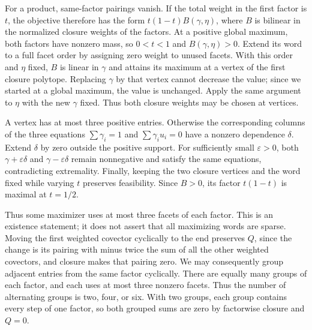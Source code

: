 For a product, same-factor pairings vanish. If the total weight in the first
factor is $t$, the objective therefore has the form
$t(1-t)B(\gamma,\eta)$, where $B$ is bilinear in the normalized closure
weights of the factors. At a positive global maximum, both factors have
nonzero mass, so $0<t<1$ and $B(\gamma,\eta)>0$. Extend its word to a full
facet order by assigning zero weight to unused facets. With this order and
$\eta$ fixed, $B$ is linear in $\gamma$ and attains its maximum at a vertex
of the first closure polytope. Replacing $\gamma$ by that vertex cannot
decrease the value; since we started at a global maximum, the value is
unchanged. Apply the same argument to $\eta$ with the new $\gamma$ fixed.
Thus both closure weights may be chosen at vertices.

A vertex has at most three positive entries. Otherwise the corresponding
columns of the three equations $\sum\gamma_i=1$ and
$\sum\gamma_i u_i=0$ have a nonzero dependence $\delta$. Extend $\delta$
by zero outside the positive support. For sufficiently small $\varepsilon>0$,
both $\gamma+\varepsilon\delta$ and $\gamma-\varepsilon\delta$ remain
nonnegative and satisfy the same equations, contradicting extremality.
Finally, keeping the two closure vertices and the word fixed while varying
$t$ preserves feasibility. Since $B>0$, its factor $t(1-t)$ is maximal at
$t=1/2$.

Thus some maximizer uses at most three facets of each factor. This is an
existence statement; it does not assert that all maximizing words are sparse.
Moving the first weighted covector cyclically to the end preserves $Q$, since
the change is its pairing with minus twice the sum of all the other weighted
covectors, and closure makes that pairing zero. We may consequently group
adjacent entries from the same factor cyclically. There are equally many
groups of each factor, and each uses at most three nonzero facets. Thus the
number of alternating groups is two, four, or six. With two groups, each
group contains every step of one factor, so both grouped sums are zero by
factorwise closure and $Q=0$.


